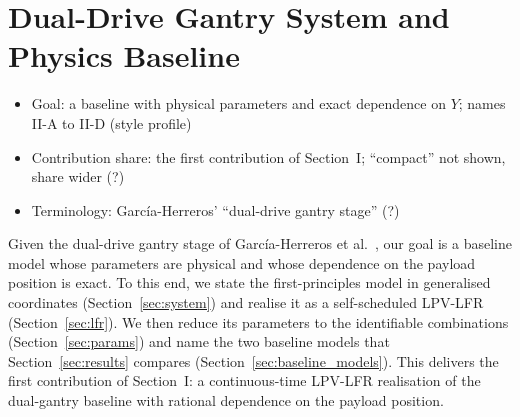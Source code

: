 \section{Dual-Drive Gantry System and Physics Baseline}\label{sec:baseline}
\ifdraft
\begin{itemize}
\item Goal: a baseline with physical parameters and exact dependence on $Y$; names II-A to II-D (style profile)
\item Contribution share: the first contribution of Section~I; ``compact'' not shown, share wider (?)
\item Terminology: Garc\'ia-Herreros' ``dual-drive gantry stage'' (?)
\end{itemize}
\fi

Given the dual-drive gantry stage of Garc\'ia-Herreros et
al.~\cite{garcia2013model}, our goal is a baseline model whose parameters are
physical and whose dependence on the payload position is exact.
To this end, we state the first-principles model in generalised coordinates
(Section~\ref{sec:system}) and realise it as a self-scheduled LPV-LFR
(Section~\ref{sec:lfr}).
We then reduce its parameters to the identifiable combinations
(Section~\ref{sec:params}) and name the two baseline models that
Section~\ref{sec:results} compares (Section~\ref{sec:baseline_models}).
This delivers the first contribution of Section~I: a continuous-time LPV-LFR
realisation of the dual-gantry baseline with rational dependence on the
payload position.

